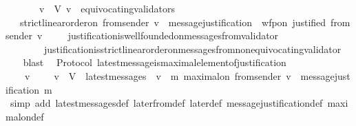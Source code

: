 \begin{isabellebody}
\ \ {\isachardoublequoteopen}{\isasymforall}\ {\isasymsigma}\ {\isasymin}\ {\isasymSigma}{\isachardot}\ {\isacharparenleft}{\isasymforall}\ v\ {\isasymin}\ V{\isachardot}\ v\ {\isasymnotin}\ equivocating{\isacharunderscore}validators\ {\isasymsigma}\ \isanewline
\ \ {\isasymlongrightarrow}\ strict{\isacharunderscore}linear{\isacharunderscore}order{\isacharunderscore}on\ {\isacharparenleft}from{\isacharunderscore}sender\ {\isacharparenleft}v{\isacharcomma}\ {\isasymsigma}{\isacharparenright}{\isacharparenright}\ message{\isacharunderscore}justification\ {\isasymand}\ wfp{\isacharunderscore}on\ justified\ {\isacharparenleft}from{\isacharunderscore}sender\ {\isacharparenleft}v{\isacharcomma}\ {\isasymsigma}{\isacharparenright}{\isacharparenright}{\isacharparenright}{\isachardoublequoteclose}\isanewline
%
\isadelimproof
\ \ %
\endisadelimproof
%
\isatagproof
{}\isamarkupfalse%
\ justification{\isacharunderscore}is{\isacharunderscore}well{\isacharunderscore}founded{\isacharunderscore}on{\isacharunderscore}messages{\isacharunderscore}from{\isacharunderscore}validator\isanewline
\ \ \ \ \ \ \ \ justification{\isacharunderscore}is{\isacharunderscore}strict{\isacharunderscore}linear{\isacharunderscore}order{\isacharunderscore}on{\isacharunderscore}messages{\isacharunderscore}from{\isacharunderscore}non{\isacharunderscore}equivocating{\isacharunderscore}validator\ \isanewline
\ \ \isamarkupfalse%
\ blast%
\endisatagproof
{\isafoldproof}%
%
\isadelimproof
\isanewline
%
\endisadelimproof
\isanewline
{}\isamarkupfalse%
\ {\isacharparenleft}\ Protocol{\isacharparenright}\ latest{\isacharunderscore}message{\isacharunderscore}is{\isacharunderscore}maximal{\isacharunderscore}element{\isacharunderscore}of{\isacharunderscore}justification\ {\isacharcolon}\isanewline
\ \ {\isachardoublequoteopen}{\isasymforall}\ {\isasymsigma}\ v{\isachardot}\ {\isasymsigma}\ {\isasymin}\ {\isasymSigma}\ {\isasymand}\ v\ {\isasymin}\ V\ {\isasymlongrightarrow}\ latest{\isacharunderscore}messages\ {\isasymsigma}\ v\ {\isacharequal}\ {\isacharbraceleft}m{\isachardot}\ maximal{\isacharunderscore}on\ {\isacharparenleft}from{\isacharunderscore}sender\ {\isacharparenleft}v{\isacharcomma}\ {\isasymsigma}{\isacharparenright}{\isacharparenright}\ message{\isacharunderscore}justification\ m{\isacharbraceright}{\isachardoublequoteclose}\isanewline
%
\isadelimproof
\ \ %
\endisadelimproof
%
\isatagproof
{}\isamarkupfalse%
\ {\isacharparenleft}simp\ add{\isacharcolon}\ latest{\isacharunderscore}messages{\isacharunderscore}def\ later{\isacharunderscore}from{\isacharunderscore}def\ later{\isacharunderscore}def\ message{\isacharunderscore}justification{\isacharunderscore}def\ maximal{\isacharunderscore}on{\isacharunderscore}def{\isacharparenright}\isanewline

\end{isabellebody}
